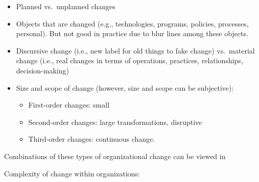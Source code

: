 \documentclass[
]{book}
\begin{document}
\begin{itemize}
\item
  Planned vs.~unplanned changes
\item
  Objects that are changed (e.g., technologies, programs, policies, processes, personal). But not good in practice due
  to blur lines among these objects.
\item
  Discursive change (i.e., new label for old things to fake change) vs.~material change (i.e., real changes in terms
  of operations, practices, relationships, decision-making) \citep[pp.10]{Zorn_1999}
\item
  Size and scope of change \citep{Bartunek_1987} (however, size and scope can be subjective):

  \begin{itemize}
  \item
    First-order changes: small
  \item
    Second-order changes: large transformations, disruptive
  \item
    Third-order changes: continuous change.
  \end{itemize}
\end{itemize}

Combinations of these types of organizational change can be viewed in \citep[pp.~42]{Lewis_2019}

Complexity of change within organizations:
\end{document}
